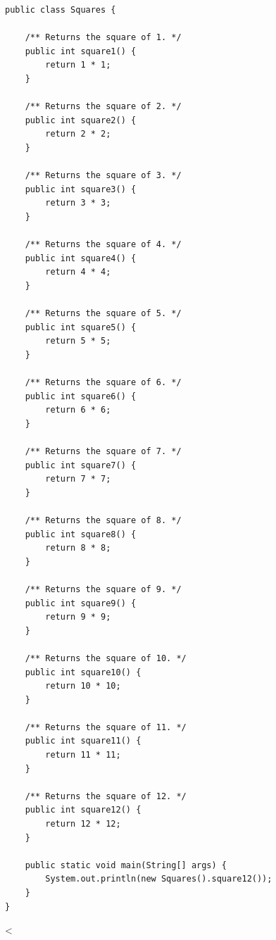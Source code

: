 \begin{verbatim}
public class Squares {

    /** Returns the square of 1. */
    public int square1() {
        return 1 * 1;
    }

    /** Returns the square of 2. */
    public int square2() {
        return 2 * 2;
    }

    /** Returns the square of 3. */
    public int square3() {
        return 3 * 3;
    }

    /** Returns the square of 4. */
    public int square4() {
        return 4 * 4;
    }

    /** Returns the square of 5. */
    public int square5() {
        return 5 * 5;
    }

    /** Returns the square of 6. */
    public int square6() {
        return 6 * 6;
    }

    /** Returns the square of 7. */
    public int square7() {
        return 7 * 7;
    }

    /** Returns the square of 8. */
    public int square8() {
        return 8 * 8;
    }

    /** Returns the square of 9. */
    public int square9() {
        return 9 * 9;
    }

    /** Returns the square of 10. */
    public int square10() {
        return 10 * 10;
    }

    /** Returns the square of 11. */
    public int square11() {
        return 11 * 11;
    }

    /** Returns the square of 12. */
    public int square12() {
        return 12 * 12;
    }

    public static void main(String[] args) {
        System.out.println(new Squares().square12());
    }
}
\end{verbatim}
\label{lst:long}
<%
